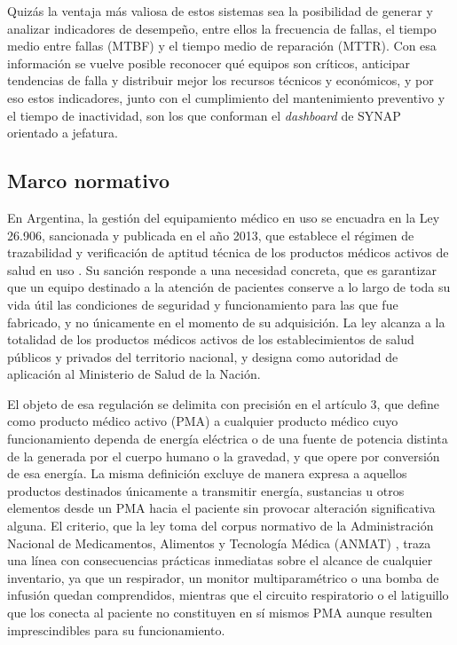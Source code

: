 \documentclass[10pt]{article}
\begin{document}
Quizás la ventaja más valiosa de estos sistemas sea la posibilidad de generar y analizar indicadores de desempeño, entre ellos la frecuencia de fallas, el tiempo medio entre fallas (MTBF) y el tiempo medio de reparación (MTTR). Con esa información se vuelve posible reconocer qué equipos son críticos, anticipar tendencias de falla y distribuir mejor los recursos técnicos y económicos, y por eso estos indicadores, junto con el cumplimiento del mantenimiento preventivo y el tiempo de inactividad, son los que conforman el \textit{dashboard} de SYNAP orientado a jefatura.

\subsection{Marco normativo}
\label{sec:marco-normativo}
En Argentina, la gestión del equipamiento médico en uso se encuadra en la Ley 26.906, sancionada y publicada en el año 2013, que establece el régimen de trazabilidad y verificación de aptitud técnica de los productos médicos activos de salud en uso \cite{ley_26906}. Su sanción responde a una necesidad concreta, que es garantizar que un equipo destinado a la atención de pacientes conserve a lo largo de toda su vida útil las condiciones de seguridad y funcionamiento para las que fue fabricado, y no únicamente en el momento de su adquisición. La ley alcanza a la totalidad de los productos médicos activos de los establecimientos de salud públicos y privados del territorio nacional, y designa como autoridad de aplicación al Ministerio de Salud de la Nación.

El objeto de esa regulación se delimita con precisión en el artículo 3, que define como producto médico activo (PMA) a cualquier producto médico cuyo funcionamiento dependa de energía eléctrica o de una fuente de potencia distinta de la generada por el cuerpo humano o la gravedad, y que opere por conversión de esa energía. La misma definición excluye de manera expresa a aquellos productos destinados únicamente a transmitir energía, sustancias u otros elementos desde un PMA hacia el paciente sin provocar alteración significativa alguna. El criterio, que la ley toma del corpus normativo de la Administración Nacional de Medicamentos, Alimentos y Tecnología Médica (ANMAT) \cite{anmat_4306_1999}, traza una línea con consecuencias prácticas inmediatas sobre el alcance de cualquier inventario, ya que un respirador, un monitor multiparamétrico o una bomba de infusión quedan comprendidos, mientras que el circuito respiratorio o el latiguillo que los conecta al paciente no constituyen en sí mismos PMA aunque resulten imprescindibles para su funcionamiento.
\end{document}
